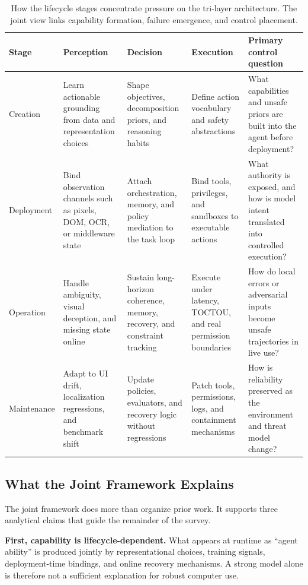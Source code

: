 \begin{table}[!t]
\centering
\small
\caption{How the lifecycle stages concentrate pressure on the tri-layer architecture. The joint view links capability formation, failure emergence, and control placement.}
\label{tab:joint_framework}
\renewcommand{\arraystretch}{1.15}
\setlength{\tabcolsep}{4.5pt}
\begin{tabularx}{\textwidth}{L{1.7cm} L{2.8cm} L{2.8cm} L{2.8cm} Y}
\toprule
\textbf{Stage} & \textbf{Perception} & \textbf{Decision} & \textbf{Execution} & \textbf{Primary control question} \\
\midrule
Creation & Learn actionable grounding from data and representation choices & Shape objectives, decomposition priors, and reasoning habits & Define action vocabulary and safety abstractions & What capabilities and unsafe priors are built into the agent before deployment? \\
Deployment & Bind observation channels such as pixels, DOM, OCR, or middleware state & Attach orchestration, memory, and policy mediation to the task loop & Bind tools, privileges, and sandboxes to executable actions & What authority is exposed, and how is model intent translated into controlled execution? \\
Operation & Handle ambiguity, visual deception, and missing state online & Sustain long-horizon coherence, memory, recovery, and constraint tracking & Execute under latency, TOCTOU, and real permission boundaries & How do local errors or adversarial inputs become unsafe trajectories in live use? \\
Maintenance & Adapt to UI drift, localization regressions, and benchmark shift & Update policies, evaluators, and recovery logic without regressions & Patch tools, permissions, logs, and containment mechanisms & How is reliability preserved as the environment and threat model change? \\
\bottomrule
\end{tabularx}
\end{table}

\subsection{What the Joint Framework Explains}
The joint framework does more than organize prior work. It supports three analytical claims that guide the remainder of the survey.

\textbf{First, capability is lifecycle-dependent.} What appears at runtime as ``agent ability'' is produced jointly by representational choices, training signals, deployment-time bindings, and online recovery mechanisms. A strong model alone is therefore not a sufficient explanation for robust computer use.

